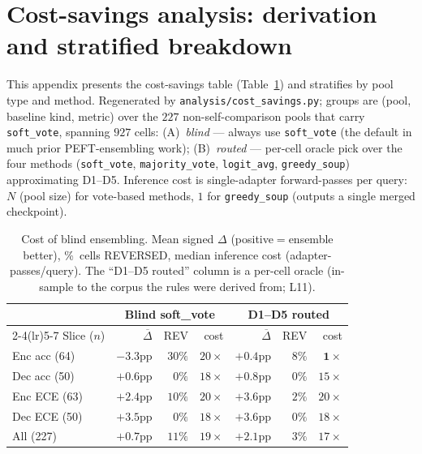 \documentclass[11pt]{article}
\begin{document}
\section{Cost-savings analysis: derivation and stratified breakdown}\label{app:cost}

{\sloppy This appendix presents the cost-savings table (Table~\ref{tab:cost}) and stratifies by pool type and method. Regenerated by \texttt{analysis/cost\_savings.py}; groups are (pool, baseline kind, metric) over the $227$ non-self-comparison pools that carry \texttt{soft\_vote}, spanning $927$ cells: (A)~\emph{blind} --- always use \texttt{soft\_vote} (the default in much prior PEFT-ensembling work); (B)~\emph{routed} --- per-cell oracle pick over the four methods (\texttt{soft\_vote}, \texttt{majority\_vote}, \texttt{logit\_avg}, \texttt{greedy\_soup}) approximating D1--D5. Inference cost is single-adapter forward-passes per query: $N$ (pool size) for vote-based methods, $1$ for \texttt{greedy\_soup} (outputs a single merged checkpoint).\par}

\begin{table}[h]
\centering
\caption{Cost of blind ensembling. Mean signed $\Delta$ (positive$=$ensemble better), \%~cells REVERSED, median inference cost (adapter-passes/query). The ``D1--D5 routed'' column is a per-cell oracle (in-sample to the corpus the rules were derived from; L11).}
\label{tab:cost}
\small
\setlength{\tabcolsep}{3pt}
\begin{tabular}{@{}lrrrrrr@{}}
\toprule
 & \multicolumn{3}{c}{Blind soft\_vote} & \multicolumn{3}{c}{D1--D5 routed} \\
\cmidrule(lr){2-4}\cmidrule(lr){5-7}
Slice ($n$) & $\overline{\Delta}$ & REV & cost & $\overline{\Delta}$ & REV & cost \\
\midrule
Enc acc (64)   & $-3.3$pp & $30\%$ & $20{\times}$ & $+0.4$pp & $8\%$ & $\mathbf{1{\times}}$ \\
Dec acc (50)   & $+0.6$pp & $0\%$  & $18{\times}$ & $+0.8$pp & $0\%$ & $15{\times}$ \\
Enc ECE (63)   & $+2.4$pp & $10\%$ & $20{\times}$ & $+3.6$pp & $2\%$ & $20{\times}$ \\
Dec ECE (50)   & $+3.5$pp & $0\%$  & $18{\times}$ & $+3.6$pp & $0\%$ & $18{\times}$ \\
\midrule
All (227)      & $+0.7$pp & $11\%$ & $19{\times}$ & $+2.1$pp & $3\%$ & $17{\times}$ \\
\bottomrule
\end{tabular}
\end{table}
\end{document}
